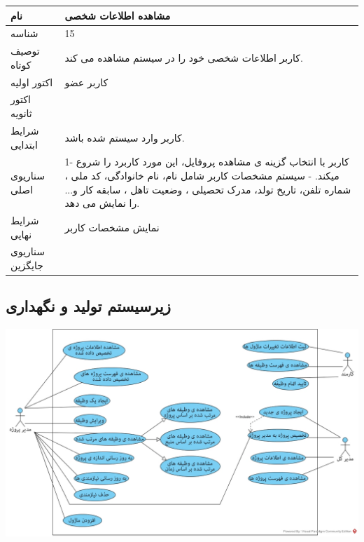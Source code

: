 \vspace{2cm}

\begin{tabular}{|p{2cm}|p{10cm}|}
\hline
نام
&
مشاهده اطلاعات شخصی
\\
\hline
شناسه
&
15
\\
\hline
توصیف کوتاه
&
کاربر اطلاعات شخصی خود را در سیستم مشاهده می کند.
\\
\hline
اکتور اولیه
&
کاربر عضو
\\
\hline
اکتور ثانویه
&

\\
\hline
شرایط ابتدایی
&
کاربر وارد سیستم شده باشد.
\\
\hline
سناریوی اصلی
&
1- کاربر با انتخاب گزینه ی مشاهده پروفایل، این مورد کاربرد را شروع میکند.
\newline
2- سیستم مشخصات کاربر شامل نام، نام خانوادگی، کد ملی ، شماره تلفن، تاریخ تولد، مدرک تحصیلی ، وضعیت تاهل ، سابقه کار و... را نمایش می دهد. 
\\
\hline
شرایط نهایی
&
نمایش مشخصات کاربر
\\
\hline
سناریوی جایگزین
&

\\
\hline
\end{tabular}


\newpage
\subsection{زیرسیستم تولید و نگهداری}

\vspace{2cm}
\begin{center}
\includegraphics[width=\textwidth]{Diagrams/Development.jpg}
\end{center}

\newpage

